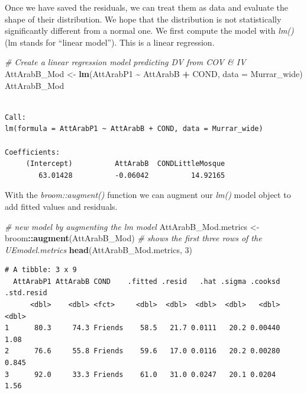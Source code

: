 \documentclass[
  11pt,
]{book}
\newenvironment{Shaded}{\begin{snugshade}}{\end{snugshade}}
\newcommand{\AttributeTok}[1]{\textcolor[rgb]{0.27,0.27,0.27}{#1}}
\newcommand{\CommentTok}[1]{\textcolor[rgb]{0.37,0.37,0.37}{\textit{#1}}}
\newcommand{\DecValTok}[1]{\textcolor[rgb]{0.06,0.06,0.06}{#1}}
\newcommand{\FunctionTok}[1]{\textcolor[rgb]{0.27,0.27,0.27}{\textbf{#1}}}
\newcommand{\NormalTok}[1]{#1}
\newcommand{\OtherTok}[1]{\textcolor[rgb]{0.37,0.37,0.37}{#1}}
\newcommand{\SpecialCharTok}[1]{\textcolor[rgb]{0.43,0.43,0.43}{\textbf{#1}}}
\begin{document}
Once we have saved the residuals, we can treat them as data and evaluate the shape of their distribution. We hope that the distribution is not statistically significantly different from a normal one. We first compute the model with \emph{lm()} (lm stands for ``linear model''). This is a linear regression.

\begin{Shaded}
\begin{Highlighting}[]
\CommentTok{\# Create a linear regression model predicting DV from COV \& IV}
\NormalTok{AttArabB\_Mod }\OtherTok{\textless{}{-}} \FunctionTok{lm}\NormalTok{(AttArabP1 }\SpecialCharTok{\textasciitilde{}}\NormalTok{ AttArabB }\SpecialCharTok{+}\NormalTok{ COND, }\AttributeTok{data =}\NormalTok{ Murrar\_wide)}
\NormalTok{AttArabB\_Mod}
\end{Highlighting}
\end{Shaded}

\begin{verbatim}

Call:
lm(formula = AttArabP1 ~ AttArabB + COND, data = Murrar_wide)

Coefficients:
     (Intercept)          AttArabB  CONDLittleMosque  
        63.01428          -0.06042          14.92165  
\end{verbatim}

With the \emph{broom::augment()} function we can augment our \emph{lm()} model object to add fitted values and residuals.

\begin{Shaded}
\begin{Highlighting}[]
\CommentTok{\# new model by augmenting the lm model}
\NormalTok{AttArabB\_Mod.metrics }\OtherTok{\textless{}{-}}\NormalTok{ broom}\SpecialCharTok{::}\FunctionTok{augment}\NormalTok{(AttArabB\_Mod)}
\CommentTok{\# shows the first three rows of the UEmodel.metrics}
\FunctionTok{head}\NormalTok{(AttArabB\_Mod.metrics, }\DecValTok{3}\NormalTok{)}
\end{Highlighting}
\end{Shaded}

\begin{verbatim}
# A tibble: 3 x 9
  AttArabP1 AttArabB COND    .fitted .resid   .hat .sigma .cooksd .std.resid
      <dbl>    <dbl> <fct>     <dbl>  <dbl>  <dbl>  <dbl>   <dbl>      <dbl>
1      80.3     74.3 Friends    58.5   21.7 0.0111   20.2 0.00440      1.08 
2      76.6     55.8 Friends    59.6   17.0 0.0116   20.2 0.00280      0.845
3      92.0     33.3 Friends    61.0   31.0 0.0247   20.1 0.0204       1.56 
\end{verbatim}
\end{document}
